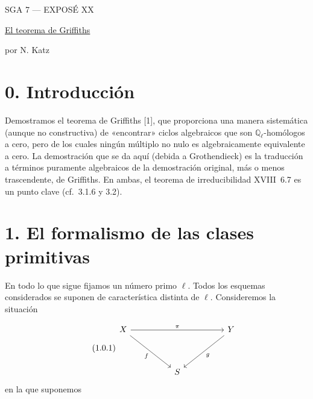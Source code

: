 \pageoriginale

\clearpage
{}
\begin{center}
{\large SGA 7 --- EXPOSÉ XX}\par
\vspace{2em}
{\Large\underline{\underline{El teorema de Griffiths}}}\par
\vspace{1.5em}
{\large por N. Katz}
\end{center}

\section*{0. Introducción}

Demostramos el teorema de Griffiths [1], que proporciona una manera
sistemática (aunque no constructiva) de «encontrar» ciclos algebraicos
que son $\mathbb Q_\ell$-homólogos a cero, pero de los cuales ningún
múltiplo no nulo es algebraicamente equivalente a cero. La demostración
que se da aquí (debida a Grothendieck) es la traducción a términos
puramente algebraicos de la demostración original, más o menos
trascendente, de Griffiths. En ambas, el teorema de irreducibilidad
XVIII~6.7 es un punto clave (cf.~3.1.6 y 3.2).

\section*{1. El formalismo de las clases primitivas}

En todo lo que sigue fijamos un número primo $\ell$. Todos los esquemas
considerados se suponen de característica distinta de $\ell$.
Consideremos la situación

\begin{equation}\tag{1.0.1}
\begin{tikzcd}[column sep=huge,row sep=huge]
X \arrow[rr,"\pi"] \arrow[dr,"f"'] & {} & Y \arrow[dl,"g"] \\
{} & S & {}
\end{tikzcd}
\end{equation}
en la que suponemos

\pageoriginale

